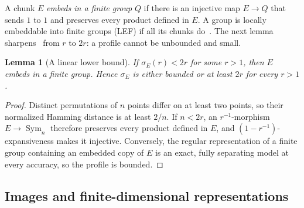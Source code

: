 \documentclass[11pt,a4paper]{article}
\theoremstyle{plain}
\newtheorem{lemma}[theorem]{Lemma}
\theoremstyle{definition}
\theoremstyle{remark}
\DeclareMathOperator{\Sym}{Sym}
\begin{document}
A chunk $E$ \emph{embeds in a finite group} $Q$ if there is an injective map $E\to Q$ that sends $1$ to $1$ and preserves every product
defined in $E$. A group is locally embeddable into finite groups (LEF) if all its chunks do~\cite{VershikGordon1997}. The next lemma sharpens~\cite[Fact~3.5]{Cornulier2013}
from $r$ to $2r$: a profile cannot be unbounded and small.

\begin{lemma}[A linear lower bound]\label{lem:floor}
If $\sigma_E(r)<2r$ for some $r>1$, then $E$ embeds in a finite group. Hence $\sigma_E$ is either bounded or at least $2r$ for every $r>1$.
\end{lemma}

\begin{proof}
Distinct permutations of $n$ points differ on at least two points, so their normalized Hamming distance is at least $2/n$. If $n<2r$, an
$r^{-1}$-morphism $E\to\Sym_n$ therefore preserves every product defined in $E$, and $(1-r^{-1})$-expansiveness makes it injective. Conversely,
the regular representation of a finite group containing an embedded copy of $E$ is an exact, fully separating model at every accuracy, so the
profile is bounded.
\end{proof}

\subsection{Images and finite-dimensional representations}\label{sec:images}
\end{document}
